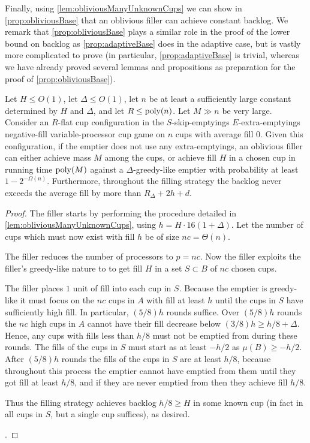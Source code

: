 Finally, using \cref{lem:obliviousManyUnknownCups} we can show in
\cref{prop:obliviousBase} that an oblivious filler can achieve
constant backlog. We remark that \cref{prop:obliviousBase} plays a
similar role in the proof of the lower bound on backlog as
\cref{prop:adaptiveBase} does in the adaptive case, but is vastly
more complicated to prove (in particular,
\cref{prop:adaptiveBase} is trivial, whereas we have already
proved several lemmas and propositions as preparation for the
proof of \cref{prop:obliviousBase}).
\begin{proposition}
  \label{prop:obliviousBase}
  Let $H \le O(1)$, let $\Delta \le O(1)$, let $n$ be at
  least a sufficiently large constant determined by $H$ and
  $\Delta$, and let $R \le \operatorname{\text{poly}}(n)$. 
  Let $M \gg n$ be very large.
  Consider an $R$-flat cup configuration in the
  $S$-skip-emptyings $E$-extra-emptyings negative-fill variable-processor cup
  game on $n$ cups with average fill $0$.
  Given this configuration, if the emptier does not use any
  extra-emptyings, an oblivious filler can either
  achieve mass $M$ among the cups, or achieve fill $H$
  in a chosen cup in running time $\operatorname{\text{poly}}(M)$ against a
  $\Delta$-greedy-like emptier with probability at least $1-2^{-\Omega(n)}.$
  Furthermore, throughout the filling strategy the backlog never
  exceeds the average fill by more than $R_\Delta + 2h + d$.
\end{proposition}
\begin{proof}
  The filler starts by performing the procedure detailed in
  \cref{lem:obliviousManyUnknownCups}, using $h = H\cdot
  16(1+\Delta)$. Let the number of cups which must now exist with
  fill $h$ be of size $nc = \Theta(n)$.

  The filler reduces the number of processors to $p=nc$. 
  Now the filler exploits the filler's greedy-like nature to
  to get fill $H$ in a set $S\subset B$ of $nc$ chosen cups.

  The filler places $1$ unit of fill into each cup in $S$.
  Because the emptier is greedy-like it must focus on the $nc$
  cups in $A$ with fill at least $h$ until the cups in $S$ have
  sufficiently high fill. In particular, $(5/8)h$ rounds suffice.
  Over $(5/8)h$ rounds the $nc$ high cups in $A$ cannot have
  their fill decrease below $(3/8)h \ge h/8 + \Delta$. Hence, any
  cups with fills less than $h/8$ must not be emptied from during
  these rounds. The fills of the cups in $S$ must start as at
  least $-h/2$ as $\mu(B) \ge -h/2$. After $(5/8)h$ rounds the
  fills of the cups in $S$ are at least $h/8$, because throughout
  this process the emptier cannot have emptied from them until
  they got fill at least $h/8$, and if they are never emptied
  from then they achieve fill $h/8$.

  Thus the filling strategy achieves backlog $h/8 \ge H$ in some
  known cup (in fact in all cups in $S$, but a single cup
  suffices), as desired.

  .

\end{proof}


